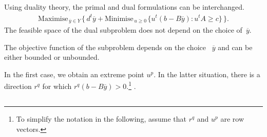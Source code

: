 \newpage
\subsection*{}


Using duality theory, the primal and dual formulations can be interchanged.
\begin{eqnarray*}
\label{bd4}  \textrm{Maximise}_{\, \overline{y} \in Y \,} \{\,
d^t\overline{y} + \textrm{Minimise}_{\, u\geq 0 \,} \{ u^t(b-B\overline{y})
: u^tA \geq c\}\, \}.
\end{eqnarray*}
The feasible space of the dual subproblem does not depend on the choice of~$\overline{y}$.



 The objective function of the subproblem depends on the choice ~$\overline{y}$ and can be either bounded or unbounded. 


\begin{center}
\end{center}


In the first case, we obtain an extreme point $u^p$. In the latter situation, there is a direction $r^q$ for which $r^q(b-B\overline{y}) > 0$.\footnote{To simplify the notation in the following, assume that $r^q$ and $u^p$ are row vectors.}   \cite{costa09benders}. 


\newpage
\subsection*{}

